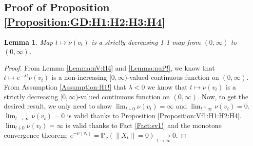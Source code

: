 \documentclass[12pt,a4paper]{amsart}
\numberwithin{equation}{section}
\theoremstyle{plain}
\newtheorem{lem}[thm]{Lemma}
\theoremstyle{definition}
\theoremstyle{remark}
\begin{document}
\subsection{Proof of Proposition \ref{Proposition:GD:H1:H2:H3:H4}}
\begin{lem} \label{Lemma:OtO:H1:H2:H4} 
Map $t \mapsto \nu(v_t)$ is a strictly decreasing 1-1 map from $(0,\infty)$ to $(0,\infty)$.
\end{lem}
\begin{proof} 
From Lemma \ref{Lemma:nV:H4} and \ref{Lemma:nuP!}, we know that $ t\mapsto e^{-\lambda t}\nu(v_t)$ is a non-increasing $[0,\infty)$-valued continuous function on $(0,\infty)$. 
From Assumption \ref{Assumption:H1!} that $\lambda < 0$ we know that $t\mapsto \nu(v_t)$ is a strictly decreasing $[0,\infty)$-valued continuous function on $(0,\infty)$.
Now, to get the desired result, we only need to show $\lim_{t\downarrow 0}\nu(v_t) = \infty$ and $\lim_{t\uparrow \infty}\nu(v_t) = 0$.
$\lim_{t\to \infty} \nu(v_t) = 0$ is valid thanks to Proposition \ref{Proposition:Vf1:H1:H2:H4}.
$\lim_{t\downarrow 0} \nu(v_t) = \infty$ is valid thanks to Fact \ref{Fact:sv1!} and the monotone convergence theorem:
$e^{-\nu(v_t)} = \mathbb P_\nu (\|X_t\| = 0) \xrightarrow[t\to \infty]{} 0$.
\end{proof}
\end{document}
